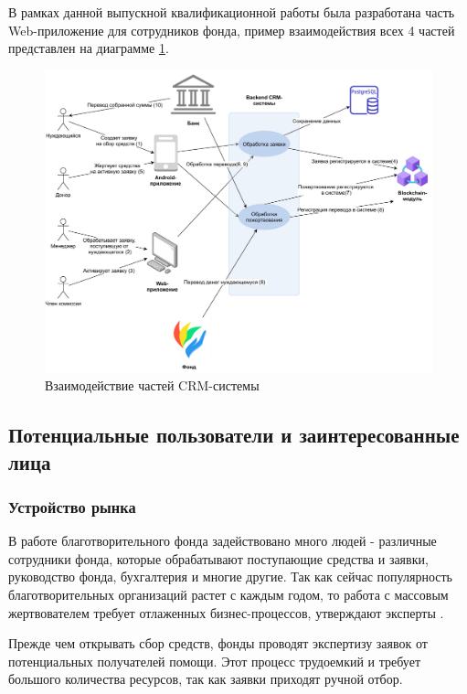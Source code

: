 \documentclass[a4paper,12pt,reqno]{article}
\begin{document}
В рамках данной выпускной квалификационной работы была разработана часть Web-приложение для сотрудников фонда, пример взаимодействия всех 4 частей представлен на диаграмме \ref{pic:flow}. 


\begin{figure}[H]
		\centering
		\includegraphics[width = \linewidth]{img/flow.pdf}
		\caption{Взаимодействие частей CRM-системы}
		\label{pic:flow}
\end{figure}


\subsection{Потенциальные пользователи и заинтересованные лица}

\subsubsection{Устройство рынка}

В работе благотворительного фонда задействовано много людей - различные сотрудники фонда, которые обрабатывают поступающие средства и заявки, руководство фонда, бухгалтерия и многие другие. Так как сейчас популярность благотворительных организаций растет с каждым годом, то работа с массовым жертвователем требует отлаженных бизнес-процессов, утверждают эксперты \cite{runok}. 

Прежде чем открывать сбор средств, фонды проводят экспертизу заявок от потенциальных получателей помощи. Этот процесс трудоемкий и требует большого количества ресурсов, так как заявки приходят ручной отбор.  
\end{document}
